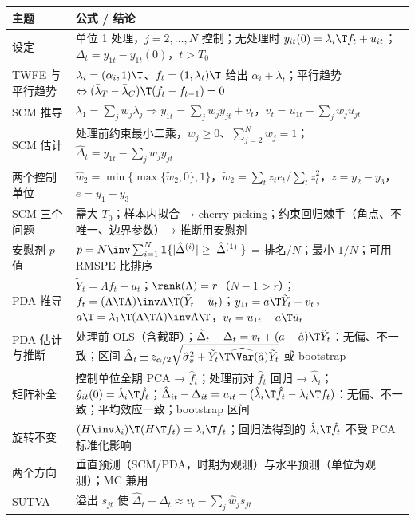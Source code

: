 \begin{center}
\small
\renewcommand{\arraystretch}{1.35}
\begin{tabularx}{\linewidth}{>{\raggedright\arraybackslash}p{2.3cm}L}
\toprule
主题 & 公式 / 结论\\
\midrule
设定 & 单位 1 处理，$j=2,\dots,N$ 控制；无处理时 $y_{it}(0)=\lambda_i\T f_t+u_{it}$；$\Delta_t=y_{1t}-y_{1t}(0)$，$t>T_0$\\
TWFE 与平行趋势 & $\lambda_i=(\alpha_i,1)\T$、$f_t=(1,\lambda_t)\T$ 给出 $\alpha_i+\lambda_t$；平行趋势 $\Leftrightarrow(\bar\lambda_T-\bar\lambda_C)\T(f_t-f_{t-1})=0$\\
SCM 推导 & $\lambda_1=\sum_jw_j\lambda_j\Rightarrow y_{1t}=\sum_jw_jy_{jt}+v_t$，$v_t=u_{1t}-\sum_jw_ju_{jt}$\\
SCM 估计 & 处理前约束最小二乘，$w_j\ge0$、$\sum_{j=2}^Nw_j=1$；$\hat\Delta_t=y_{1t}-\sum_j\hat w_jy_{jt}$\\
两个控制单位 & $\hat w_2=\min\{\max\{\tilde w_2,0\},1\}$，$\tilde w_2=\sum_tz_te_t/\sum_tz_t^2$，$z=y_2-y_3$，$e=y_1-y_3$\\
SCM 三个问题 & 需大 $T_0$；样本内拟合 → cherry picking；约束回归棘手（角点、不唯一、边界参数）→ 推断用安慰剂\\
安慰剂 $p$ 值 & $p=N\inv\sum_{i=1}^N\mathbf{1}\{|\hat\Delta^{(i)}|\ge|\hat\Delta^{(1)}|\}$ = 排名$/N$；最小 $1/N$；可用 RMSPE 比排序\\
PDA 推导 & $\tilde Y_t=\Lambda f_t+\tilde u_t$；$\rank(\Lambda)=r$（$N-1>r$）；$f_t=(\Lambda\T\Lambda)\inv\Lambda\T(\tilde Y_t-\tilde u_t)$；$y_{1t}=a\T\tilde Y_t+v_t$，$a\T=\lambda_1\T(\Lambda\T\Lambda)\inv\Lambda\T$，$v_t=u_{1t}-a\T\tilde u_t$\\
PDA 估计与推断 & 处理前 OLS（含截距）；$\hat\Delta_t-\Delta_t=v_t+(a-\hat a)\T\tilde Y_t$：无偏、不一致；区间 $\hat\Delta_t\pm z_{\alpha/2}\sqrt{\hat\sigma_v^2+\tilde Y_t\T\widehat{\Var}(\hat a)\tilde Y_t}$ 或 bootstrap\\
矩阵补全 & 控制单位全期 PCA → $\hat f_t$；处理前对 $\hat f_t$ 回归 → $\hat\lambda_i$；$\hat y_{it}(0)=\hat\lambda_i\T\hat f_t$；$\hat\Delta_{it}-\Delta_{it}=u_{it}-(\hat\lambda_i\T\hat f_t-\lambda_i\T f_t)$：无偏、不一致；平均效应一致；bootstrap 区间\\
旋转不变 & $(H\inv\lambda_i)\T(H\T f_t)=\lambda_i\T f_t$；回归法得到的 $\hat\lambda_i\T\hat f_t$ 不受 PCA 标准化影响\\
两个方向 & 垂直预测（SCM/PDA，时期为观测）与水平预测（单位为观测）；MC 兼用\\
SUTVA & 溢出 $s_{jt}$ 使 $\hat\Delta_t-\Delta_t\approx v_t-\sum_j\hat w_js_{jt}$\\
\bottomrule
\end{tabularx}
\label{tab:U16-core}
\end{center}

